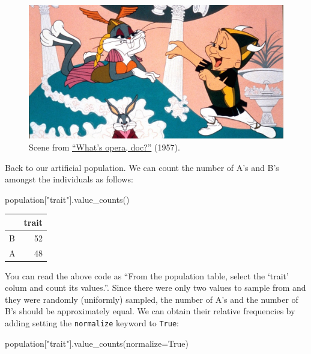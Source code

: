 \documentclass[
  a4paperpaper,
  ,captions=tableheading
]{scrbook}
\newenvironment{Shaded}{\begin{snugshade}}{\end{snugshade}}
\newcommand{\NormalTok}[1]{\textcolor[rgb]{0.00,0.23,0.31}{#1}}
\newcommand{\OperatorTok}[1]{\textcolor[rgb]{0.37,0.37,0.37}{#1}}
\newcommand{\StringTok}[1]{\textcolor[rgb]{0.13,0.47,0.30}{#1}}
\newcommand{\VariableTok}[1]{\textcolor[rgb]{0.07,0.07,0.07}{#1}}
\begin{document}
\begin{figure}

{\centering \includegraphics{img/opera.jpeg}

}

\caption{Scene from
\href{https://en.wikipedia.org/wiki/What\%27s_Opera,_Doc}{``What's
opera, doc?''} (1957).}

\end{figure}

Back to our artificial population. We can count the number of A's and
B's amongst the individuals as follows:

\begin{Shaded}
\begin{Highlighting}[]
\NormalTok{population[}\StringTok{"trait"}\NormalTok{].value\_counts()}
\end{Highlighting}
\end{Shaded}

\begin{tabular}{lr}
\toprule
{} &  trait \\
\midrule
B &     52 \\
A &     48 \\
\bottomrule
\end{tabular}

You can read the above code as ``From the population table, select the
`trait' colum and count its values.''. Since there were only two values
to sample from and they were randomly (uniformly) sampled, the number of
A's and the number of B's should be approximately equal. We can obtain
their relative frequencies by adding setting the \texttt{normalize}
keyword to \texttt{True}:

\begin{Shaded}
\begin{Highlighting}[]
\NormalTok{population[}\StringTok{"trait"}\NormalTok{].value\_counts(normalize}\OperatorTok{=}\VariableTok{True}\NormalTok{)}
\end{Highlighting}
\end{Shaded}
\end{document}
